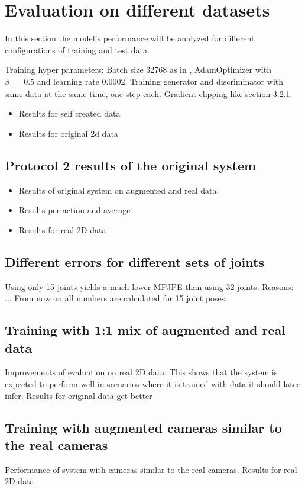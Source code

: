 \section{Evaluation on different datasets}
\label{sec:evaluation}


In this section the model's performance will be analyzed for different configurations of training and test data.

Training hyper parameters:
Batch size 32768 as in \cite{drover18}, AdamOptimizer with $\beta_1 = 0.5$ and learning rate $0.0002$, Training generator and discriminator with same data at the same time, one step each. Gradient clipping like \citet{chorowski14} section 3.2.1.


\begin{itemize}
	\item Results for self created data
	\item Results for original 2d data
\end{itemize}

\subsection{Protocol 2 results of the original system}
\begin{itemize}
	\item Results of original system on augmented and real data.
	\item Results per action and average
	\item Results for real 2D data
\end{itemize}


\subsection{Different errors for different sets of joints}
Using only 15 joints yields a much lower MPJPE than using 32 joints. Reasons: ...	
From now on all numbers are calculated for 15 joint poses.

\subsection{Training with 1:1 mix of augmented and real data}
Improvements of evaluation on real 2D data. 
This shows that the system is expected to perform well in scenarios where it is trained with data it should later infer.
Results for original data get better



\subsection{Training with augmented cameras similar to the real cameras}
Performance of system with cameras similar to the real cameras.
Results for real 2D data.